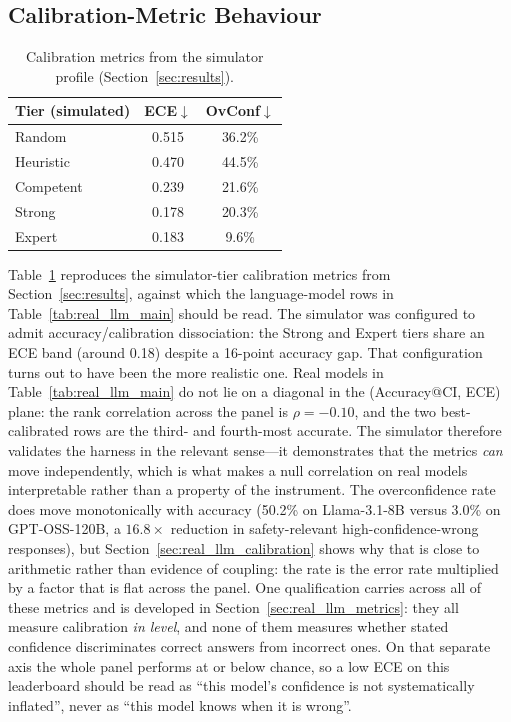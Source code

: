 \documentclass{article}
\begin{document}
\subsection{Calibration-Metric Behaviour}
\label{sec:calibration}

\begin{table}
\vspace{-12pt}
\centering
\caption{Calibration metrics from the simulator profile (Section~\ref{sec:results}).}
\label{tab:calibration}
\begin{tabular}{lcc}
\toprule
\textbf{Tier (simulated)} & \textbf{ECE}$\downarrow$ & \textbf{OvConf}$\downarrow$ \\
\midrule
Random & 0.515 & 36.2\% \\
Heuristic & 0.470 & 44.5\% \\
Competent & 0.239 & 21.6\% \\
Strong & 0.178 & 20.3\% \\
Expert & 0.183 & 9.6\% \\
\bottomrule
\end{tabular}
\vspace{-12pt}
\end{table}

Table~\ref{tab:calibration} reproduces the simulator-tier calibration metrics from Section~\ref{sec:results}, against which the language-model rows in Table~\ref{tab:real_llm_main} should be read. The simulator was configured to admit accuracy/calibration dissociation: the Strong and Expert tiers share an ECE band (around 0.18) despite a 16-point accuracy gap. That configuration turns out to have been the more realistic one. Real models in Table~\ref{tab:real_llm_main} do not lie on a diagonal in the (Accuracy@CI, ECE) plane: the rank correlation across the panel is $\rho = -0.10$, and the two best-calibrated rows are the third- and fourth-most accurate. The simulator therefore validates the harness in the relevant sense---it demonstrates that the metrics \emph{can} move independently, which is what makes a null correlation on real models interpretable rather than a property of the instrument. The overconfidence rate does move monotonically with accuracy (50.2\% on Llama-3.1-8B versus 3.0\% on GPT-OSS-120B, a $16.8\times$ reduction in safety-relevant high-confidence-wrong responses), but Section~\ref{sec:real_llm_calibration} shows why that is close to arithmetic rather than evidence of coupling: the rate is the error rate multiplied by a factor that is flat across the panel. One qualification carries across all of these metrics and is developed in Section~\ref{sec:real_llm_metrics}: they all measure calibration \emph{in level}, and none of them measures whether stated confidence discriminates correct answers from incorrect ones. On that separate axis the whole panel performs at or below chance, so a low ECE on this leaderboard should be read as ``this model's confidence is not systematically inflated'', never as ``this model knows when it is wrong''.
\end{document}
